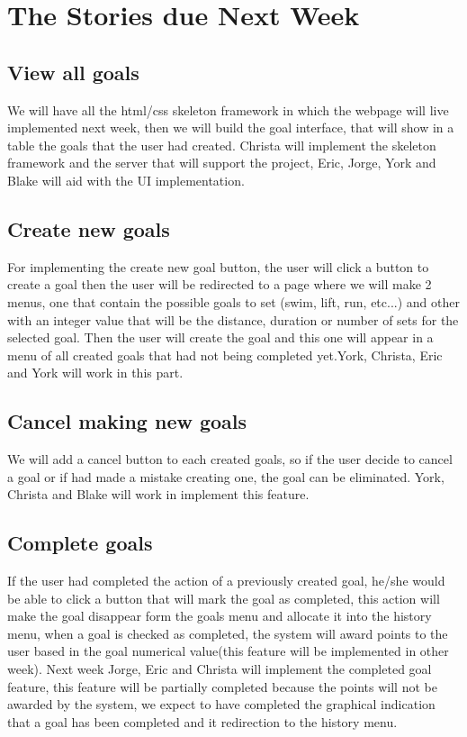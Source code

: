 \documentclass[a4paper]{article}
\begin{document}
\section{The Stories due Next Week}

\subsection{View all goals}
We will have all the html/css skeleton framework in which the webpage will live implemented next week, then we will build the goal interface, that will show in a table the goals that the user had created.
\newline
\newline
Christa will implement the skeleton framework and the server that will support the project, Eric, Jorge, York and Blake will aid with the UI implementation.

\subsection{Create new goals}
For implementing the create new goal button, the user will click a button to create a goal then the user will be redirected to a page where we will make 2 menus, one that contain the possible goals to set (swim, lift, run, etc...) and other with an integer value that will be the distance, duration or number of sets for the selected goal.
\newline
\newline
Then the user will create the goal and this one will appear in a menu of all created goals that had not being completed yet.York, Christa, Eric and York will work in this part.

\subsection{Cancel making new goals}
We will add a cancel button to each created goals, so if the user decide to cancel a goal or if had made a mistake creating one, the goal can be eliminated. York, Christa and Blake will work in implement this feature.

\subsection{Complete goals}
If the user had completed the action of a previously created goal, he/she would be able to click a button that will mark the goal as completed, this action will make the goal disappear form the goals menu and allocate it into the history menu, when a goal is checked as completed, the system will award points to the user based in the goal numerical value(this feature will be implemented in other week). 
\newline
\newline
Next week Jorge, Eric and Christa will implement the completed goal feature, this feature will be partially completed because the points will not be awarded by the system, we expect to have completed the graphical indication that a goal has been completed and it redirection to the history menu.
\end{document}
